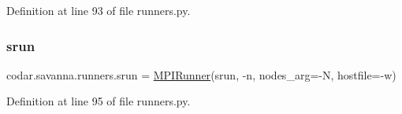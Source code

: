 Definition at line 93 of file runners.\+py.

\mbox{\label{namespacecodar_1_1savanna_1_1runners_abc37053bb8c8a1d6bbdcfc5602a93e4d}} 
\subsubsection{\texorpdfstring{srun}{srun}}
{\footnotesize\ttfamily codar.\+savanna.\+runners.\+srun = \hyperlink{classcodar_1_1savanna_1_1runners_1_1_m_p_i_runner}{M\+P\+I\+Runner}(\textquotesingle{}srun\textquotesingle{}, \textquotesingle{}-\/n\textquotesingle{}, nodes\+\_\+arg=\textquotesingle{}-\/N\textquotesingle{}, hostfile=\textquotesingle{}-\/w\textquotesingle{})}



Definition at line 95 of file runners.\+py.


